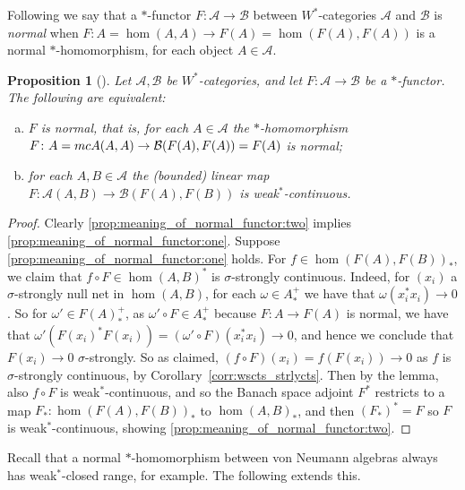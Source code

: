 \documentclass[a4paper,11pt]{article}
\theoremstyle{plain}
\newtheorem{proposition}{Proposition}[section]
\theoremstyle{remark}
\newcommand{\mc}[1]{\mathcal{#1}}
\begin{document}
Following \cite[Definition~2.11]{GLR_Wstar_categories} we say that a $*$-functor $F\colon\mc A\to\mc B$ between $W^*$-categories $\mc A$ and $\mc B$ is \emph{normal} when $F\colon A=\hom(A,A) \to F(A) = \hom(F(A), F(A))$ is a normal $*$-homomorphism, for each object $A\in\mc A$.  

\begin{proposition}[{\cite[Proposition~2.12]{GLR_Wstar_categories}}]\label{prop:meaning_of_normal_functor}
Let $\mc A, \mc B$ be $W^*$-categories, and let $F\colon\mc A\to\mc B$ be a $*$-functor.  The following are equivalent:
\begin{enumerate}[(a)]
  \item\label{prop:meaning_of_normal_functor:one}
  $F$ is normal, that is, for each $A\in\mc A$ the $*$-homomorphism $F \colon A = \\mc A(A,A) \to \mc B(F(A), F(A)) = F(A)$ is normal;
  \item\label{prop:meaning_of_normal_functor:two}
  for each $A,B\in\mc A$ the (bounded) linear map $F \colon \mc A(A,B) \to \mc B(F(A), F(B))$ is weak$^*$-continuous.
\end{enumerate}
\end{proposition}
\begin{proof}
Clearly \ref{prop:meaning_of_normal_functor:two} implies \ref{prop:meaning_of_normal_functor:one}.  Suppose \ref{prop:meaning_of_normal_functor:one} holds.  For $f \in \hom(F(A), F(B))_*$, we claim that $f \circ F \in \hom(A,B)^*$ is $\sigma$-strongly continuous.  Indeed, for $(x_i)$ a $\sigma$-strongly null net in $\hom(A,B)$, for each $\omega \in A_*^+$ we have that $\omega(x_i^*x_i) \to 0$.  So for $\omega' \in F(A)_*^+$, as $\omega' \circ F \in A_*^+$ because $F\colon A\to F(A)$ is normal, we have that $\omega'(F(x_i)^*F(x_i)) = (\omega'\circ F)(x_i^*x_i) \to 0$, and hence we conclude that $F(x_i) \to 0$ $\sigma$-strongly.  So as claimed, $(f\circ F)(x_i) = f(F(x_i)) \to 0$ as $f$ is $\sigma$-strongly continuous, by Corollary~\ref{corr:wscts_strlycts}.  Then by the lemma, also $f\circ F$ is weak$^*$-continuous, and so the Banach space adjoint $F^*$ restricts to a map $F_* \colon \hom(F(A), F(B))_*$ to $\hom(A,B)_*$, and then $(F_*)^* = F$ so $F$ is weak$^*$-continuous, showing \ref{prop:meaning_of_normal_functor:two}.
\end{proof}

Recall that a normal $*$-homomorphism between von Neumann algebras always has weak$^*$-closed range, \cite[Proposition~1.16.2.]{Sakai_Book} for example.  The following extends this.
\end{document}
